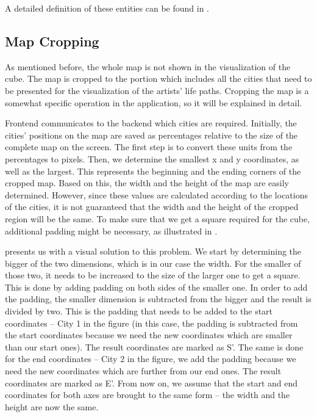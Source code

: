 A detailed definition of these entities can be found in .

\subsection{Map Cropping}\label{subsec:map-cropping}
As mentioned before, the whole map is not shown in the visualization of the cube. The map is cropped to the portion which includes all the cities
that need to be presented for the visualization of the artists' life paths. Cropping the map is a somewhat specific operation in the application, so
it will be explained in detail.

Frontend communicates to the backend which cities are required. Initially, the cities' positions on the map are saved as percentages relative to the
size of the complete map on the screen. The first step is to convert these units from the percentages to pixels. Then, we determine the smallest x
and y coordinates, as well as the largest. This represents the beginning and the ending corners of the cropped map. Based on this, the width and the
height of the map are easily determined. However, since these values are calculated according to the locations of the cities, it is not guaranteed
that the width and the height of the cropped region will be the same. To make sure that we get a square required for the cube, additional padding
might be necessary, as illustrated in .

 presents us with a visual solution to this problem. We start by determining the bigger of the two dimensions, which is
in our case the width. For the smaller of those two, it needs to be increased to the size of the larger one to get a square. This is done by adding
padding on both sides of the smaller one. In order to add the padding, the smaller dimension is subtracted from the bigger and the result is divided
by two. This is the padding that needs to be added to the start coordinates -- City 1 in the figure (in this case, the padding is subtracted from the
start coordinates because we need the new coordinates which are smaller than our start ones). The result coordinates are marked as S'. The same
is done for the end coordinates -- City 2 in the figure, we add the padding because we need the new coordinates which are further from our end ones.
The result coordinates are marked as E'. From now on, we assume that the start and end coordinates for both axes are brought to the same form -- the
width and the height are now the same.


